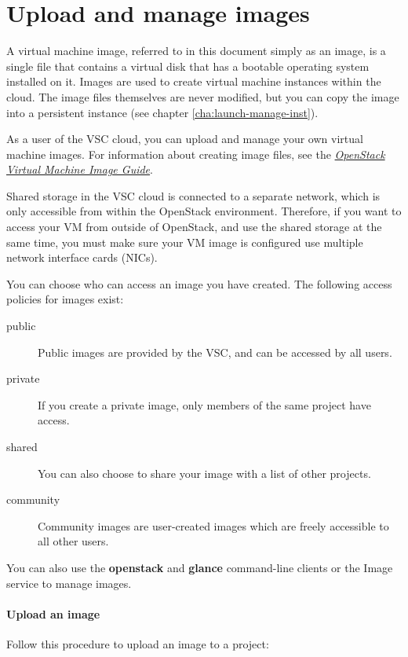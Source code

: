 \chapter{Upload and manage images}\label{cha:upload-manage-images}

A virtual machine image, referred to in this document simply as an
image, is a single file that contains a virtual disk that has a
bootable operating system installed on it. Images are used to create
virtual machine instances within the cloud.  The image files
themselves are never modified, but you can copy the image into a persistent instance (see chapter \ref{cha:launch-manage-inst}).

As a user of the VSC cloud, you can upload and manage your own virtual
machine images.  For information about creating image files, see the
\href{https://docs.openstack.org/image-guide/}{\emph{OpenStack Virtual
    Machine Image Guide}}.

 Shared storage in the VSC cloud is connected to a separate network, which is only accessible from within the OpenStack environment.  Therefore, if you want to access your VM from outside of OpenStack, and use the shared storage at the same time, you must make sure your VM image is configured use multiple network interface cards (NICs).

You can choose who can access an image you have created.  The following access policies for images exist:
\begin{description}
\item[public] Public images are provided by the VSC, and can be accessed by all users.
\item[private] If you create a private image, only members of the same
  project have access.
\item[shared] You can also choose to share your image with a list of
  other projects.
\item[community] Community images are user-created images which are
  freely accessible to all other users.
\end{description}

 You can also use the \textbf{openstack} and
\textbf{glance} command-line clients or the Image service to manage
images.

\subsubsection{Upload an image}
Follow this procedure to upload an image to a project:

